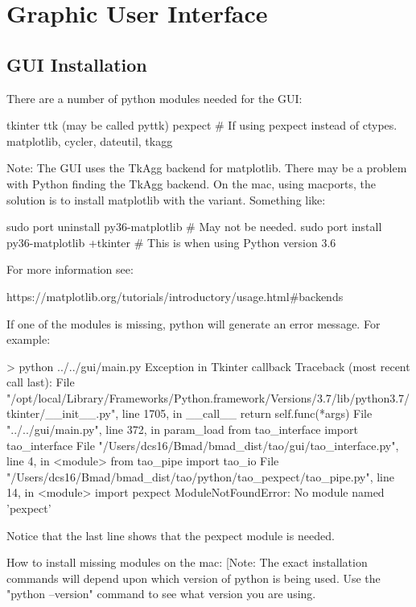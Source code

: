 \chapter{Graphic User Interface}
\label{c:gui}

\section{GUI Installation}
\label{s:gui.install}

There are a number of python modules needed for the GUI:
\begin{example}
  tkinter
  ttk (may be called pyttk)
  pexpect         # If using pexpect instead of ctypes.
  matplotlib, cycler, dateutil, tkagg
\end{example}
Note: The GUI uses the TkAgg backend for matplotlib. There may be a problem with Python finding the
TkAgg backend. On the mac, using macports, the solution is to install matplotlib with the
 variant. Something like:
\begin{example}
  sudo port uninstall py36-matplotlib           # May not be needed.
  sudo port install  py36-matplotlib +tkinter   # This is when using Python version 3.6
\end{example}
For more information see:
\begin{example}
  https://matplotlib.org/tutorials/introductory/usage.html#backends
\end{example}

If one of the modules is missing, python will generate an error message. For example:
\begin{example}
> python ../../gui/main.py
Exception in Tkinter callback
Traceback (most recent call last):
  File "/opt/local/Library/Frameworks/Python.framework/Versions/3.7/lib/python3.7/tkinter/__init__.py", line 1705, in __call__
    return self.func(*args)
  File "../../gui/main.py", line 372, in param_load
    from tao_interface import tao_interface
  File "/Users/dcs16/Bmad/bmad_dist/tao/gui/tao_interface.py", line 4, in <module>
    from tao_pipe import tao_io
  File "/Users/dcs16/Bmad/bmad_dist/tao/python/tao_pexpect/tao_pipe.py", line 14, in <module>
    import pexpect
ModuleNotFoundError: No module named 'pexpect'
\end{example}
Notice that the last line shows that the pexpect module is needed.

How to install missing modules on the mac: [Note: The exact installation commands will depend upon
which version of python is being used. Use the "python --version" command to see what version you
are using.

